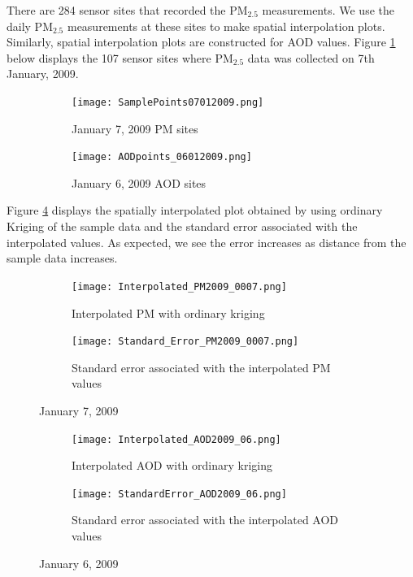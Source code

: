 \documentclass[10pt]{article}
\begin{document}
There are 284 sensor sites that recorded the PM$_{2.5}$ measurements. We use the daily  PM$_{2.5}$ measurements at these sites to make spatial interpolation plots. Similarly, spatial interpolation plots are constructed for AOD values. Figure \ref{fig:a}  below displays the 107 sensor sites where PM$_{2.5}$ data was collected on 7th January, 2009. 

\begin{figure}[H]
\centering
\begin{subfigure}{.5\textwidth}
  \centering
  \texttt{[image: SamplePoints07012009.png]}
  \caption{January 7, 2009 PM sites}
  \label{fig:a}
\end{subfigure}%
\begin{subfigure}{.5\textwidth}
  \centering
  \texttt{[image: AODpoints\_06012009.png]}
  \caption{January 6, 2009 AOD sites}
  \label{fig:b}
\end{subfigure}
\caption{}
\label{aodpm}
\end{figure}


Figure \ref{examplepm} displays the spatially interpolated plot obtained by using ordinary Kriging of the sample data and the standard error associated with the interpolated values. As expected, we see the error increases as distance from the sample data increases. 

\begin{figure}[H]
\centering
\begin{subfigure}{.5\textwidth}
  \centering
  \texttt{[image: Interpolated\_PM2009\_0007.png]}
  \caption{ Interpolated PM with ordinary kriging}
\end{subfigure}%
\begin{subfigure}{.5\textwidth}
  \centering
  \texttt{[image: Standard\_Error\_PM2009\_0007.png]}
  \caption{Standard error associated with the interpolated PM values}
\end{subfigure}
\caption{January 7, 2009}
\label{examplepm}
\end{figure}




\begin{figure}[H]
\centering
\begin{subfigure}{.5\textwidth}
  \centering
  \texttt{[image: Interpolated\_AOD2009\_06.png]}
  \caption{Interpolated AOD with ordinary kriging}
\end{subfigure}%
\begin{subfigure}{.5\textwidth}
  \centering
  \texttt{[image: StandardError\_AOD2009\_06.png]}
    \caption{Standard error associated with the interpolated AOD values}
\end{subfigure}
\caption{January 6, 2009}
\label{exampleaod}
\end{figure}
\end{document}
